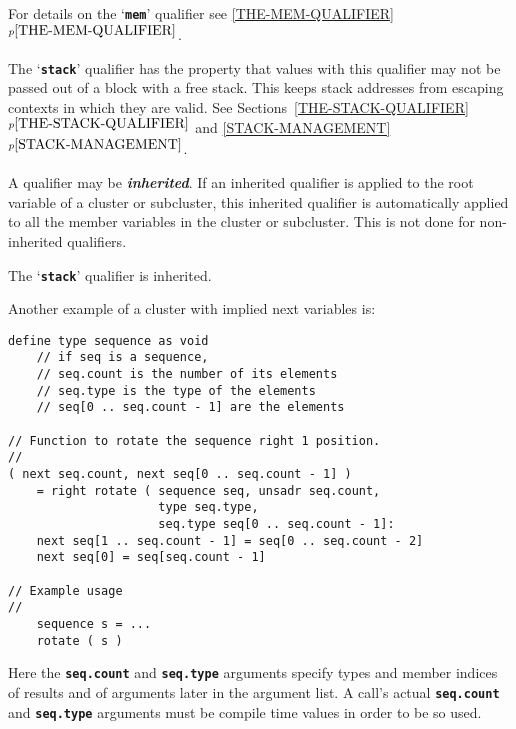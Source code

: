 \documentclass[12pt]{article}
\newcommand{\TT}[1]{{\tt \bfseries #1}}
\newcommand{\ikey}[2]{{\bf \em #1}\index{#2}}
\newcommand{\itemref}[1]{\ref{#1}$^{p\pageref{#1}}$}
\newenvironment{indpar}[1][0.3in]%
	{\begin{list}{}%
		     {\setlength{\itemsep}{0in}%
		      \setlength{\topsep}{0in}%
		      \setlength{\parsep}{1ex}%
		      \setlength{\labelwidth}{#1}%
		      \setlength{\leftmargin}{#1}%
		      \addtolength{\leftmargin}{\labelsep}}%
	 \item}%
	{\end{list}}
\begin{document}
For details on the `\TT{mem}' qualifier see \itemref{THE-MEM-QUALIFIER}.

The `\TT{stack}' qualifier has the property that values with
this qualifier may not be passed out of a block with a free
stack.  This keeps stack addresses from escaping contexts in
which they are valid.  See Sections~\itemref{THE-STACK-QUALIFIER} and
\itemref{STACK-MANAGEMENT}.

A qualifier may be \ikey{inherited}{qualifier}\label{INHERITED-QUALIFIER}.
If an inherited qualifier
is applied to the root variable of a cluster
or subcluster, this inherited qualifier is automatically applied to all
the member variables in the cluster or subcluster.  This is not done
for non-inherited qualifiers.

The `\TT{stack}' qualifier is inherited.

Another example of a cluster with implied next variables is:
\begin{indpar}\begin{verbatim}
define type sequence as void
    // if seq is a sequence,
    // seq.count is the number of its elements
    // seq.type is the type of the elements
    // seq[0 .. seq.count - 1] are the elements

// Function to rotate the sequence right 1 position.
//
( next seq.count, next seq[0 .. seq.count - 1] )
    = right rotate ( sequence seq, unsadr seq.count,
                     type seq.type,
                     seq.type seq[0 .. seq.count - 1]:
    next seq[1 .. seq.count - 1] = seq[0 .. seq.count - 2]
    next seq[0] = seq[seq.count - 1]

// Example usage
//
    sequence s = ...
    rotate ( s )
\end{verbatim}\end{indpar}
Here the \TT{seq.count} and \TT{seq.type} arguments
specify types and member indices
of results and of arguments later in the argument list.  A call's actual
\TT{seq.count} and \TT{seq.type} arguments must be compile time values
in order to be so used.
\end{document}
